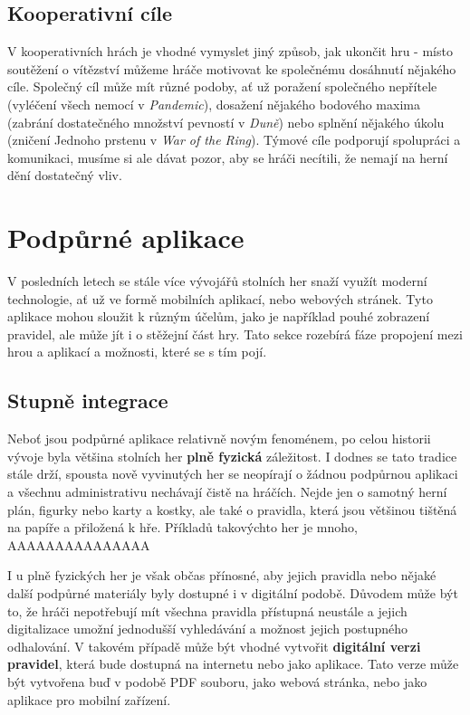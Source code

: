 \subsection{Kooperativní cíle}
\label{subsec:cooperative_goals}

V kooperativních hrách je vhodné vymyslet jiný způsob, jak ukončit hru - místo soutěžení o vítězství můžeme hráče motivovat ke společnému dosáhnutí nějakého cíle. Společný cíl může mít různé podoby, ať už poražení společného nepřítele (vyléčení všech nemocí v \textit{Pandemic}), dosažení nějakého bodového maxima (zabrání dostatečného množství pevností v \textit{Duně}) nebo splnění nějakého úkolu (zničení Jednoho prstenu v \textit{War of the Ring}). Týmové cíle podporují spolupráci a komunikaci, musíme si ale dávat pozor, aby se hráči necítili, že nemají na herní dění dostatečný vliv.


\section{Podpůrné aplikace}
\label{sec:app}

V posledních letech se stále více vývojářů stolních her snaží využít moderní technologie, ať už ve formě mobilních aplikací, nebo webových stránek. Tyto aplikace mohou sloužit k různým účelům, jako je například pouhé zobrazení pravidel, ale může jít i o stěžejní část hry. Tato sekce rozebírá fáze propojení mezi hrou a aplikací a možnosti, které se s tím pojí.

\subsection{Stupně integrace}
\label{subsec:app_integration}

Neboť jsou podpůrné aplikace relativně novým fenoménem, po celou historii vývoje byla většina stolních her \textbf{plně fyzická} záležitost. I dodnes se tato tradice stále drží, spousta nově vyvinutých her se neopírají o žádnou podpůrnou aplikaci a všechnu administrativu nechávají čistě na hráčích. Nejde jen o samotný herní plán, figurky nebo karty a kostky, ale také o pravidla, která jsou většinou tištěná na papíře a přiložená k hře. Příkladů takovýchto her je mnoho, AAAAAAAAAAAAAAA

I u plně fyzických her je však občas přínosné, aby jejich pravidla nebo nějaké další podpůrné materiály byly dostupné i v digitální podobě. Důvodem může být to, že hráči nepotřebují mít všechna pravidla přístupná neustále a jejich digitalizace umožní jednodušší vyhledávání a možnost jejich postupného odhalování. V takovém případě může být vhodné vytvořit \textbf{digitální verzi pravidel}, která bude dostupná na internetu nebo jako aplikace. Tato verze může být vytvořena buď v podobě PDF souboru, jako webová stránka, nebo jako aplikace pro mobilní zařízení.


